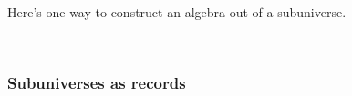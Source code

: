 \ccpad
Here's one way to construct an algebra out of a subuniverse.
\ccpad
\begin{code}%
\>[1]\AgdaSpace{}%
\AgdaSymbol{:}\AgdaSpace{}%
\AgdaSymbol{(}\AgdaSpace{}%
\AgdaSymbol{:}\AgdaSpace{}%
\AgdaSpace{}%
\AgdaSpace{}%
\AgdaSymbol{)(}\AgdaSpace{}%
\AgdaSymbol{:}\AgdaSpace{}%
\AgdaSpace{}%
\AgdaSpace{}%
\AgdaSpace{}%
\AgdaSpace{}%
\AgdaSymbol{)}\AgdaSpace{}%
\AgdaSpace{}%
\AgdaSpace{}%
\AgdaSpace{}%
\AgdaSpace{}%
\AgdaSpace{}%
\AgdaSpace{}%
\AgdaSpace{}%
\AgdaSymbol{(}\AgdaSpace{}%
\AgdaSpace{}%
\AgdaSymbol{)}\AgdaSpace{}%
\<%
\\
%
\>[1]\AgdaSpace{}%
\AgdaSpace{}%
\AgdaSpace{}%
\AgdaSpace{}%
\AgdaSymbol{=}\AgdaSpace{}%
\AgdaSpace{}%
\AgdaSpace{}%
\AgdaOperator{\AgdaInductiveConstructor{,}}\AgdaSpace{}%
\AgdaSpace{}%
\AgdaSpace{}%
\AgdaSpace{}%
\AgdaSpace{}%
\AgdaSymbol{(}\AgdaSpace{}%
\AgdaSpace{}%
\AgdaSymbol{)(}\AgdaSpace{}%
\AgdaSpace{}%
\AgdaSymbol{)}\AgdaSpace{}%
\AgdaOperator{\AgdaInductiveConstructor{,}}\AgdaSpace{}%
\AgdaSpace{}%
\AgdaSpace{}%
\AgdaSymbol{(}\AgdaSpace{}%
\AgdaSpace{}%
\AgdaSymbol{)(}\AgdaSpace{}%
\AgdaSpace{}%
\AgdaSymbol{)}\<%
\end{code}

\subsubsection{Subuniverses as records}\label{subuniverses-as-records}

